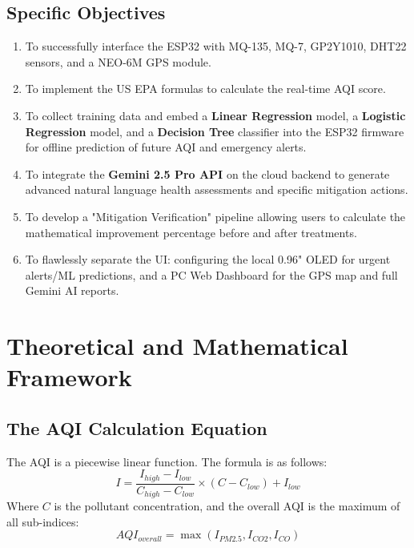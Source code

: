 \documentclass[12pt,a4paper]{report}
\begin{document}
\section{Specific Objectives}
\begin{enumerate}[label=\textbf{O\arabic*.}, leftmargin=*, itemsep=10pt]
    \item To successfully interface the ESP32 with MQ-135, MQ-7, GP2Y1010, DHT22 sensors, and a NEO-6M GPS module.
    \item To implement the US EPA formulas to calculate the real-time AQI score.
    \item To collect training data and embed a \textbf{Linear Regression} model, a \textbf{Logistic Regression} model, and a \textbf{Decision Tree} classifier into the ESP32 firmware for offline prediction of future AQI and emergency alerts.
    \item To integrate the \textbf{Gemini 2.5 Pro API} on the cloud backend to generate advanced natural language health assessments and specific mitigation actions.
    \item To develop a "Mitigation Verification" pipeline allowing users to calculate the mathematical improvement percentage before and after treatments.
    \item To flawlessly separate the UI: configuring the local 0.96" OLED for urgent alerts/ML predictions, and a PC Web Dashboard for the GPS map and full Gemini AI reports.
\end{enumerate}

\chapter{Theoretical and Mathematical Framework}
\section{The AQI Calculation Equation}
The AQI is a piecewise linear function. The formula is as follows:
\begin{equation}
    I = \frac{I_{high} - I_{low}}{C_{high} - C_{low}} \times (C - C_{low}) + I_{low}
\end{equation}
Where $C$ is the pollutant concentration, and the overall AQI is the maximum of all sub-indices:
\begin{equation}
    AQI_{overall} = \max(I_{PM2.5}, I_{CO2}, I_{CO})
\end{equation}
\end{document}
